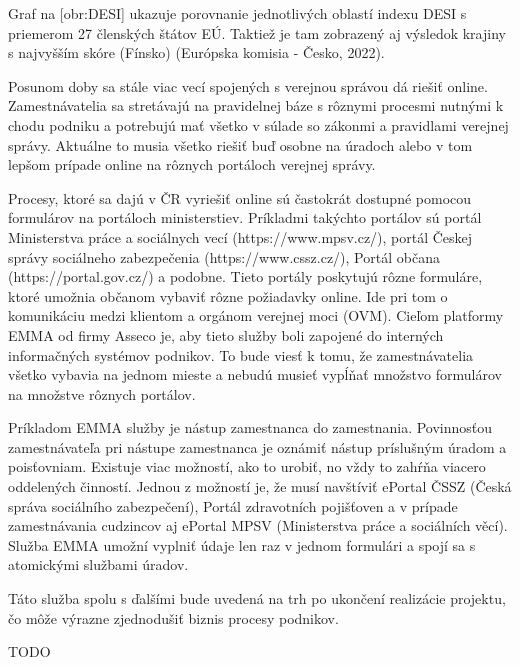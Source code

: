 Graf na [obr:DESI] ukazuje porovnanie jednotlivých oblastí indexu DESI s priemerom 27 členských štátov EÚ. Taktiež je tam zobrazený aj výsledok krajiny s najvyšším skóre (Fínsko) \scr(Európska komisia - Česko, 2022).


Posunom doby sa stále viac vecí spojených s verejnou správou dá riešiť online. Zamestnávatelia sa stretávajú na pravidelnej báze s rôznymi procesmi nutnými k chodu podniku a potrebujú mať všetko v súlade so zákonmi a pravidlami verejnej správy. Aktuálne to musia všetko riešiť buď osobne na úradoch alebo v tom lepšom prípade online na rôznych portáloch verejnej správy.

Procesy, ktoré sa dajú v ČR vyriešiť online sú častokrát dostupné pomocou formulárov na portáloch ministerstiev. Príkladmi takýchto portálov sú portál Ministerstva práce a sociálnych vecí (https://www.mpsv.cz/), portál Českej správy sociálneho zabezpečenia (https://www.cssz.cz/), Portál občana (https://portal.gov.cz/) a podobne. Tieto portály poskytujú rôzne formuláre, ktoré umožnia občanom vybaviť rôzne požiadavky online. Ide pri tom o komunikáciu medzi klientom a orgánom verejnej moci (OVM). Cieľom platformy EMMA od firmy Asseco je, aby tieto služby boli zapojené do interných informačných systémov podnikov. To bude viesť k tomu, že zamestnávatelia všetko vybavia na jednom mieste a nebudú musieť vypĺňať množstvo formulárov na množstve rôznych portálov.

Príkladom EMMA služby je nástup zamestnanca do zamestnania. Povinnosťou zamestnávateľa pri nástupe zamestnanca je oznámiť nástup príslušným úradom a poisťovniam. Existuje viac možností, ako to urobiť, no vždy to zahŕňa viacero oddelených činností. Jednou z možností je, že musí navštíviť ePortal ČSSZ (Česká správa sociálního zabezpečení), Portál zdravotních pojišťoven a v prípade zamestnávania cudzincov aj ePortal MPSV (Ministerstva práce a sociálních věcí). Služba EMMA umožní vyplniť údaje len raz v jednom formulári a spojí sa s atomickými službami úradov. 

Táto služba spolu s ďalšími bude uvedená na trh po ukončení realizácie projektu, čo môže výrazne zjednodušiť biznis procesy podnikov. 

\TODO
TODO



